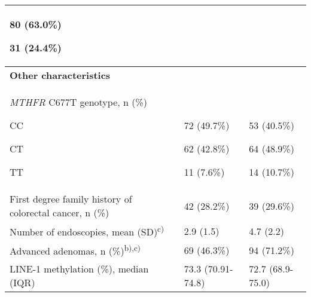 \begin{flushleft}
\begin{supertabular}{m{5.5cm}m{3.5cm}m{3cm}}
{ 80 (63.0\%)}

 31 (24.4\%)\\\hline
\bfseries Other characteristics &
~
 &
~
\\\hline
{
{\textit{MTHFR}}{ C677T
genotype, n (\%)}}

{ CC}

{ CT}

 TT &
~

{ 72 (49.7\%)}

{ 62 (42.8\%)}

 11 (7.6\%) &
~

{ 53 (40.5\%)}

{ 64 (48.9\%)}

 14 (10.7\%)\\\hline
 First degree family history of
colorectal cancer, n (\%) &
 42 (28.2\%) &
 39 (29.6\%)\\\hline
 Number of endoscopies, mean
(SD)\textsuperscript{c)} &
 2.9 (1.5) &
 4.7 (2.2)\\\hline
 Advanced adenomas, n
(\%)\textsuperscript{b),c)} &
 69 (46.3\%) &
 94 (71.2\%)\\\hline
 LINE-1 methylation (\%), median (IQR)
&
 73.3 (70.91-74.8) &
 72.7 (68.9-75.0)\\\hline
\end{supertabular}
\end{flushleft}


